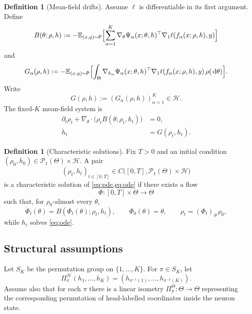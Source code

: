 \documentclass[11pt]{article}
\theoremstyle{definition}
\newtheorem{definition}[theorem]{Definition}
\newcommand{\E}{\mathbb{E}}
\newcommand{\PP}{\mathcal{P}}
\newcommand{\dd}{\,\mathrm{d}}
\begin{document}
\begin{definition}[Mean-field drifts]
Assume $\ell$ is differentiable in its first argument. Define
\begin{equation}
  B(\theta;\rho,h)
  :=
  -\E_{(x,y)\sim\mathsf P}
  \Bigl[
    \sum_{\alpha=1}^K
    \nabla_\theta \Psi_\alpha(x;\theta,h)^\top
    \nabla_1\ell(f_\alpha(x;\rho,h),y)
  \Bigr]
  \label{eq:drift-B}
\end{equation}
and
\begin{equation}
  G_\alpha(\rho,h)
  :=
  -\E_{(x,y)\sim\mathsf P}
  \Bigl[
    \int_\Theta
    \nabla_{h_\alpha}\Psi_\alpha(x;\theta,h)^\top
    \nabla_1\ell(f_\alpha(x;\rho,h),y)\,\rho(\dd\theta)
  \Bigr].
  \label{eq:drift-G}
\end{equation}
Write
\[
  G(\rho,h):=(G_\alpha(\rho,h))_{\alpha=1}^K\in\mathcal H.
\]
The fixed-$K$ mean-field system is
\begin{align}
  \partial_t \rho_t
  +
  \nabla_\theta\cdot\bigl(\rho_t B(\theta;\rho_t,h_t)\bigr)
  &=0,
  \label{eq:pde}\\
  \dot h_t &= G(\rho_t,h_t).
  \label{eq:ode}
\end{align}
\end{definition}

\begin{definition}[Characteristic solutions]
Fix $T>0$ and an initial condition $(\rho_0,h_0)\in\PP_1(\Theta)\times\mathcal H$.
A pair
\[
  (\rho_t,h_t)_{t\in[0,T]}
  \in
  C\bigl([0,T],\PP_1(\Theta)\times\mathcal H\bigr)
\]
is a characteristic solution of \cref{eq:pde,eq:ode} if there exists a flow
\[
  \Phi:[0,T]\times\Theta\to\Theta
\]
such that, for $\rho_0$-almost every $\theta$,
\[
  \dot\Phi_t(\theta)=B(\Phi_t(\theta);\rho_t,h_t),
  \qquad
  \Phi_0(\theta)=\theta,
  \qquad
  \rho_t=(\Phi_t)_\#\rho_0,
\]
while $h_t$ solves \cref{eq:ode}.
\end{definition}

\subsection{Structural assumptions}

Let $S_K$ be the permutation group on $\{1,\dots,K\}$. For $\pi\in S_K$, let
\[
  \Pi_\pi^\mathcal H(h_1,\dots,h_K)
  =
  (h_{\pi^{-1}(1)},\dots,h_{\pi^{-1}(K)}).
\]
Assume also that for each $\pi$ there is a linear isometry
$\Pi_\pi^\Theta:\Theta\to\Theta$ representing the corresponding permutation of
head-labelled coordinates inside the neuron state.
\end{document}
